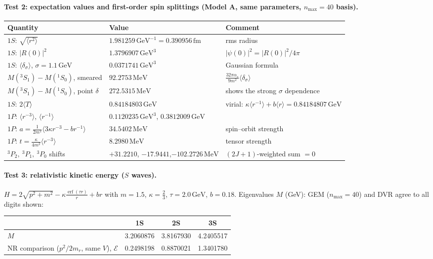 \documentclass[11pt,a4paper]{article}
\numberwithin{equation}{section}
\theoremstyle{definition}
\theoremstyle{plain}
\theoremstyle{remark}
\numberwithin{algorithm}{section}
\newcommand{\as}{\alpha_s}
\newcommand{\erf}{\operatorname{erf}}
\newcommand{\mr}{m_r}
\newcommand{\GeV}{\,\mathrm{GeV}}
\newcommand{\MeV}{\,\mathrm{MeV}}
\newcommand{\fm}{\,\mathrm{fm}}
\begin{document}
\paragraph{Test 2: expectation values and first-order spin splittings (Model A, same parameters, $n_{\max}=40$ basis).}
\begin{center}\small
\begin{tabular}{@{}>{\raggedright\arraybackslash}p{4.6cm}>{\raggedright\arraybackslash}p{4.4cm}>{\raggedright\arraybackslash}p{5.6cm}@{}}\toprule
Quantity & Value & Comment\\\midrule
$1S$: $\sqrt{\langle r^2\rangle}$ & $1.981259\GeV^{-1}=0.390956\fm$ & rms radius\\
$1S$: $|R(0)|^2$ & $1.3796907\GeV^3$ & $|\psi(0)|^2=|R(0)|^2/4\pi$\\
$1S$: $\langle\delta_\sigma\rangle$, $\sigma=1.1\GeV$ & $0.0371741\GeV^3$ & Gaussian formula\\
$M({}^3S_1)-M({}^1S_0)$, smeared & $92.2753\MeV$ & $\frac{32\pi\as}{9m^2}\langle\delta_\sigma\rangle$\\
$M({}^3S_1)-M({}^1S_0)$, point $\delta$ & $272.5315\MeV$ & shows the strong $\sigma$ dependence\\
$1S$: $2\langle T\rangle$ & $0.84184803\GeV$ & virial: $\kappa\langle r^{-1}\rangle+b\langle r\rangle=0.84184807\GeV$\\
$1P$: $\langle r^{-3}\rangle$, $\langle r^{-1}\rangle$ & $0.1120235\GeV^3$, $0.3812009\GeV$ & \\
$1P$: $a=\frac{1}{2m^2}\langle3\kappa r^{-3}-br^{-1}\rangle$ & $34.5402\MeV$ & spin--orbit strength\\
$1P$: $t=\frac{\kappa}{4m^2}\langle r^{-3}\rangle$ & $8.2980\MeV$ & tensor strength\\
${}^3P_2,\ {}^3P_1,\ {}^3P_0$ shifts & $+31.2210$, $-17.9441$,\newline $-102.2726\MeV$ & $(2J+1)$-weighted sum $=0$\\\bottomrule
\end{tabular}
\end{center}

\paragraph{Test 3: relativistic kinetic energy ($S$ waves).} $H=2\sqrt{p^2+m^2}-\kappa\frac{\erf(\tau r)}{r}+br$ with $m=1.5$, $\kappa=\frac23$, $\tau=2.0\GeV$, $b=0.18$. Eigenvalues $M$ (GeV): GEM ($n_{\max}=40$) and DVR agree to all digits shown:
\begin{center}\small
\begin{tabular}{@{}lccc@{}}\toprule
 & 1S & 2S & 3S\\\midrule
$M$ & 3.2060876 & 3.8167930 & 4.2405517\\
NR comparison ($p^2/2\mr$, same $V$), $\mathcal E$ & 0.2498198 & 0.8870021 & 1.3401780\\\bottomrule
\end{tabular}
\end{center}
\end{document}
